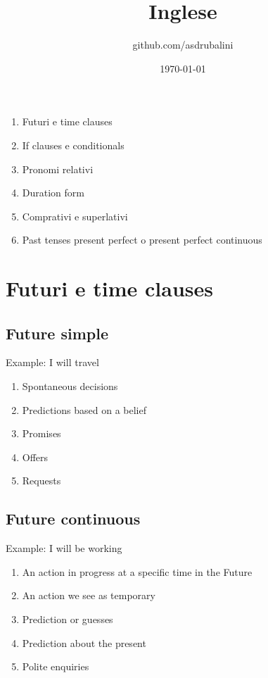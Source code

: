 \documentclass{article}
\title{Inglese}
\author{github.com/asdrubalini}
\date{\today}
\begin{document}
    \maketitle

    \begin{enumerate}
        \item Futuri e time clauses
        \item If clauses e conditionals
        \item Pronomi relativi
        \item Duration form
        \item Comprativi e superlativi
        \item Past tenses present perfect o present perfect continuous
    \end{enumerate}

    \section{Futuri e time clauses}

    \subsection{Future simple}

    Example: I will travel

    \begin{enumerate}
        \item Spontaneous decisions
        \item Predictions based on a belief
        \item Promises
        \item Offers
        \item Requests
    \end{enumerate}

    \subsection{Future continuous}

    Example: I will be working

    \begin{enumerate}
        \item An action in progress at a specific time in the Future
        \item An action we see as temporary
        \item Prediction or guesses
        \item Prediction about the present
        \item Polite enquiries
    \end{enumerate}
\end{document}
